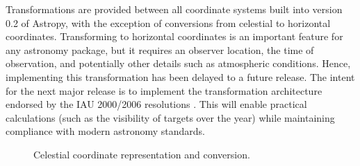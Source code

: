 \documentclass[traditabstract]{aa}
\begin{document}
Transformations are provided between all coordinate systems built into version
0.2 of Astropy, with the exception of conversions from
celestial to horizontal coordinates. Transforming to horizontal coordinates is
an important feature for any astronomy package, but it requires an observer
location, the time of observation, and potentially other details such as
atmospheric conditions. Hence, implementing this transformation has been
delayed to a future release. The intent for the next major release is to
implement the transformation architecture endorsed by the IAU 2000/2006
resolutions \citep[see e.g.,][]{soffel03, usnocircular179}. This will enable
practical calculations (such as the visibility of targets over the year) while
maintaining compliance with modern astronomy standards.

\begin{figure}
\caption{Celestial coordinate representation and conversion.\label{code:coords}}
\end{figure}
\end{document}
